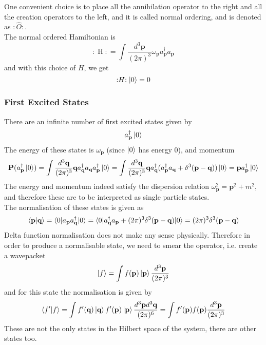 \documentclass[11pt]{article}
\newcommand{\w}{\omega}
\newcommand{\normord}[1]{:\mathrel{#1}:}
\numberwithin{equation}{section}
\begin{document}
    One convenient choice is to place all the annihilation operator to the right and all the creation operators to the left, and it is called normal ordering, and is denoted as \(\normord{\hat{O}}\). \\

    The normal ordered Hamiltonian is 
    \begin{equation}
        \normord{H} = \int \frac{d^3\textbf{p}}{(2\pi)^3} \w_\textbf{p} a^\dagger_\textbf{p} a_\textbf{p}
    \end{equation}
    and with this choice of \(H\), we get 
    \begin{equation*}
        \normord{H}\ket{0} = 0
    \end{equation*}
    
    \subsubsection{First Excited States} 
    There are an infinite number of first excited states given by 
    \begin{equation*}
        a^\dagger_\textbf{p}\ket{0}
    \end{equation*}
    The energy of these states is \(\w_\textbf{p}\) (since \(\ket{0}\) has energy 0), and momentum
    \begin{equation*}
        \textbf{P}(a^\dagger_\textbf{p}\ket{0}) = \int \frac{d^3\textbf{q}}{(2\pi)^3} \textbf{q}a^\dagger_\textbf{q}a_\textbf{q}a^\dagger_\textbf{p}\ket{0} = \int \frac{d^3\textbf{q}}{(2\pi)^3} \textbf{q}a^\dagger_\textbf{q}(a^\dagger_\textbf{p}a_\textbf{q} + \delta^3(\textbf{p} - \textbf{q}))\ket{0} = \textbf{p}a^\dagger_\textbf{p}\ket{0}
    \end{equation*}
    The energy and momentum indeed satisfy the dispersion relation \(\w_\textbf{p}^2 = \textbf{p}^2 + m^2\), and therefore these are to be interpreted as single particle states. \\

    The normalisation of these states is given as 
    \begin{equation}
        \braket{\textbf{p}|\textbf{q}} = \braket{0|a_\textbf{p}a^\dagger_\textbf{q}|0} = \braket{0|a^\dagger_\textbf{q}a_\textbf{p} + (2\pi)^3\delta^3(\textbf{p}-\textbf{q})|0} = (2\pi)^3\delta^3(\textbf{p}-\textbf{q})
    \end{equation}
    Delta function normalisation does not make any sense physically. Therefore in order to produce a normalisable state, we need to smear the operator, i.e. create a wavepacket
    \begin{equation*}
        \ket{f} = \int f(\textbf{p}) \ket{\textbf{p}} \frac{d^3\textbf{p}}{(2\pi)^3}
    \end{equation*}
    and for this state the normalisation is given by 
    \begin{equation*}
        \braket{f'|f} = \int f'(\textbf{q}) \ket{\textbf{q}} f'(\textbf{p}) \ket{\textbf{p}} \frac{d^3\textbf{p}d^3\textbf{q}}{(2\pi)^6} = \int f'(\textbf{p})f(\textbf{p}) \frac{d^3\textbf{p}}{(2\pi)^3}
    \end{equation*}
    These are not the only states in the Hilbert space of the system, there are other states too.
\end{document}
